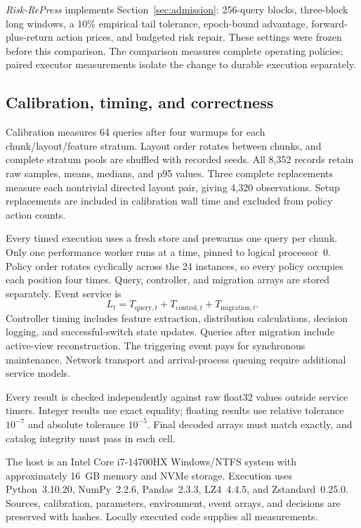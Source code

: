 \textit{Risk-RePress} implements Section~\ref{sec:admission}: 256-query blocks, three-block long windows, a 10\% empirical tail tolerance, epoch-bound advantage, forward-plus-return action prices, and budgeted risk repair. These settings were frozen before this comparison. The comparison measures complete operating policies; paired executor measurements isolate the change to durable execution separately.

\subsection{Calibration, timing, and correctness}
Calibration measures 64 queries after four warmups for each chunk/layout/feature stratum. Layout order rotates between chunks, and complete stratum pools are shuffled with recorded seeds. All 8,352 records retain raw samples, means, medians, and p95 values. Three complete replacements measure each nontrivial directed layout pair, giving 4,320 observations. Setup replacements are included in calibration wall time and excluded from policy action counts.

Every timed execution uses a fresh store and prewarms one query per chunk. Only one performance worker runs at a time, pinned to logical processor~0. Policy order rotates cyclically across the 24 instances, so every policy occupies each position four times. Query, controller, and migration arrays are stored separately. Event service is
\begin{equation}
L_t=T_{\mathrm{query},t}+T_{\mathrm{control},t}+T_{\mathrm{migration},t}.
\end{equation}
Controller timing includes feature extraction, distribution calculations, decision logging, and successful-switch state updates. Queries after migration include active-view reconstruction. The triggering event pays for synchronous maintenance. Network transport and arrival-process queuing require additional service models.

Every result is checked independently against raw float32 values outside service timers. Integer results use exact equality; floating results use relative tolerance $10^{-7}$ and absolute tolerance $10^{-5}$. Final decoded arrays must match exactly, and catalog integrity must pass in each cell.

The host is an Intel Core i7-14700HX Windows/NTFS system with approximately 16~GB memory and NVMe storage. Execution uses Python~3.10.20, NumPy~2.2.6, Pandas~2.3.3, LZ4~4.4.5, and Zstandard~0.25.0. Sources, calibration, parameters, environment, event arrays, and decisions are preserved with hashes. Locally executed code supplies all measurements.

